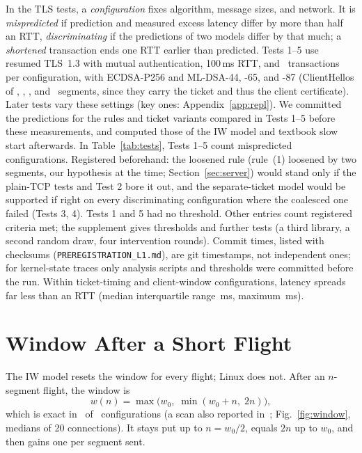\documentclass[sigconf,9pt,nonacm]{acmart}
\newcommand{\ms}{\,ms\xspace}
\newcommand{\citeone}{\cite{paperone}}
\begin{document}
In the TLS tests, a \emph{configuration} fixes algorithm, message sizes, and network. It is \emph{mispredicted} if prediction and measured excess latency differ by more than half an RTT, \emph{discriminating} if the predictions of two models differ by that much; a \emph{shortened} transaction ends one RTT earlier than predicted. Tests 1--5 use resumed TLS~1.3 with mutual authentication, 100\ms RTT, and \NPerCell\ transactions per configuration, with ECDSA-P256 and ML-DSA-44, -65, and -87 (ClientHellos of \ChSegEc, \ChSegMlFourFour, \ChSegMlSixFive, and \ChSegMlEightSeven\ segments, since they carry the ticket and thus the client certificate). Later tests vary these settings (key ones: Appendix~\ref{app:repl}). We committed the predictions for the rules and ticket variants compared in Tests 1--5 before these measurements, and computed those of the IW model and textbook slow start afterwards. In Table~\ref{tab:tests}, Tests 1--5 count mispredicted configurations. Registered beforehand: the loosened rule (rule~(1) loosened by two segments, our hypothesis at the time; Section~\ref{sec:server}) would stand only if the plain-TCP tests and Test 2 bore it out, and the separate-ticket model would be supported if right on every discriminating configuration where the coalesced one failed (Tests 3, 4). Tests 1 and 5 had no threshold. Other entries count registered criteria met; the supplement gives thresholds and further tests (a third library, a second random draw, four intervention rounds). Commit times, listed with checksums (\texttt{PREREGISTRATION\_L1.md}), are git timestamps, not independent ones; for kernel-state traces only analysis scripts and thresholds were committed before the run. Within ticket-timing and client-window configurations, latency spreads far less than an RTT (median interquartile range \SpreadMed\ms, maximum \SpreadMax\ms).

\section{Window After a Short Flight}\label{sec:window}
The IW model resets the window for every flight; Linux does not. After an $n$-segment flight, the window is
\begin{equation}
w(n)=\max\bigl(w_0,\;\min(w_0+n,\;2n)\bigr),
\end{equation}
which is exact in \NExact\ of \NCfg\ configurations (a scan also reported in~\citeone; Fig.~\ref{fig:window}, medians of 20 connections). It stays put up to $n=w_0/2$, equals $2n$ up to $w_0$, and then gains one per segment sent.
\end{document}

